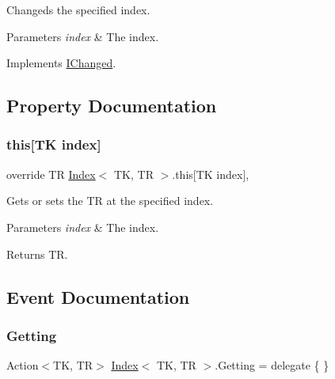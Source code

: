 Changeds the specified index. 


\begin{DoxyParams}{Parameters}
{\em index} & The index.\\
\hline
\end{DoxyParams}


Implements \hyperlink{interface_i_changed_a7d4904db56316c1cc3aa98b112dd4ca8}{I\+Changed}.



\subsection{Property Documentation}
\mbox{\label{class_index_a55f528c0402412e4a0223895b89d559f}} 
\subsubsection{\texorpdfstring{this[T\+K index]}{this[TK index]}}
{\footnotesize\ttfamily override TR \hyperlink{class_index}{Index}$<$ TK, TR $>$.this\mbox{[}TK index\mbox{]}\hspace{0.3cm}{\ttfamily [get]}, {\ttfamily [set]}}



Gets or sets the TR at the specified index. 


\begin{DoxyParams}{Parameters}
{\em index} & The index.\\
\hline
\end{DoxyParams}
\begin{DoxyReturn}{Returns}
TR.
\end{DoxyReturn}


\subsection{Event Documentation}
\mbox{\label{class_index_a7b5c195702db7df525a4ae4dd9f17d36}} 
\subsubsection{\texorpdfstring{Getting}{Getting}}
{\footnotesize\ttfamily Action$<$TK, TR$>$ \hyperlink{class_index}{Index}$<$ TK, TR $>$.Getting = delegate \{ \}}



